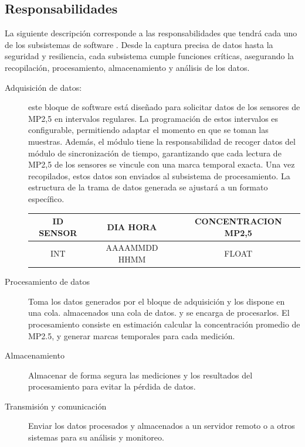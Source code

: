 \documentclass[
11pt, %
codirector, %
]{charter}
\begin{document}
\newpage

\subsection{Responsabilidades}

La siguiente descripción corresponde a las responsabilidades que tendrá cada uno de los subsistemas de software \namesoftware. Desde la captura precisa de datos hasta la seguridad y resiliencia, cada subsistema cumple funciones críticas, asegurando la recopilación, procesamiento, almacenamiento y análisis de los datos.

\begin{description}
	\item[Adquisición de datos:] este bloque de software está diseñado para solicitar datos de los sensores de MP2,5 en intervalos regulares. La programación de estos intervalos es configurable, permitiendo adaptar el momento en que se toman las muestras. Además, el módulo tiene la responsabilidad de recoger datos del módulo de sincronización de tiempo, garantizando que cada lectura de MP2,5 de los sensores se vincule con una marca temporal exacta. Una vez recopilados, estos datos son enviados al subsistema de procesamiento. La estructura de la trama de datos generada se ajustará a un formato específico.
	
	\bigskip
	\begin{tabular}{|c|c|c|}
		\hline
		\textbf{ID SENSOR} &   \textbf{DIA HORA} & \textbf{CONCENTRACION MP2,5} \\
		\hline
		INT & AAAAMMDD HHMM & FLOAT \\
		\hline
	\end{tabular}

	\bigskip
	
	\item[Procesamiento de datos] Toma los datos generados por el bloque de adquisición y los dispone en una cola.  almacenados una cola de datos.  y se encarga de procesarlos. El procesamiento consiste en estimación  calcular la concentración promedio de MP2.5, y generar marcas temporales para cada medición.
	
	\item[Almacenamiento] Almacenar de forma segura las mediciones y los resultados del procesamiento para evitar la pérdida de datos.
	
	\item[Transmisión y comunicación] Enviar los datos procesados y almacenados a un servidor remoto o a otros sistemas para su análisis y monitoreo.
	

\end{description}
\end{document}
